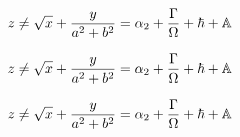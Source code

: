 \documentclass{article}
\begin{document}


$$z\neq\sqrt{x}+{y\over a^2+b^2} = \alpha_2+{\Gamma\over\Omega}+\hbar+\Bbb A$$

\boldmath

$$z\neq\sqrt{x}+{y\over a^2+b^2} = \alpha_2+{\Gamma\over\Omega}+\hbar+\Bbb A$$

\unboldmath

$$z\neq\sqrt{x}+{y\over a^2+b^2} = \alpha_2+{\Gamma\over\Omega}+\hbar+\Bbb A$$
\end{document}
